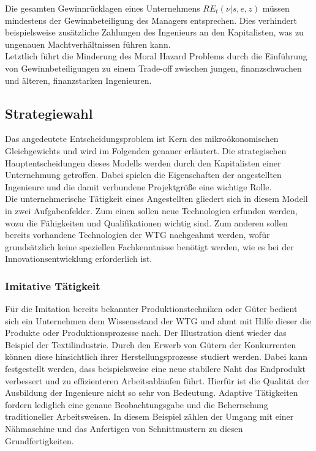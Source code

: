 Die gesamten Gewinnrücklagen eines Unternehmens $RE_t(\nu|s,e,z)$ müssen mindestens der Gewinnbeteiligung des Managers entsprechen. Dies verhindert beispielsweise zusätzliche Zahlungen des Ingenieurs an den Kapitalisten, was zu ungenauen Machtverhältnissen führen kann. \\


Letztlich führt die Minderung des Moral Hazard Problems durch die Einführung von Gewinnbeteiligungen zu einem Trade-off zwischen jungen, finanzschwachen und älteren, finanzstarken Ingenieuren. 


\subsection{Strategiewahl}\label{sec:Strategiewahl}
Das angedeutete Entscheidungsproblem ist Kern des mikroökonomischen Gleichgewichts und wird im Folgenden genauer erläutert. Die strategischen Hauptentscheidungen dieses Modells werden durch den Kapitalisten einer Unternehmung getroffen. Dabei spielen die Eigenschaften der angestellten Ingenieure und die damit verbundene Projektgrö{\ss}e eine wichtige Rolle. \\
Die unternehmerische Tätigkeit eines Angestellten gliedert sich in diesem Modell in zwei Aufgabenfelder. Zum einen sollen neue Technologien erfunden werden, wozu die Fähigkeiten und Qualifikationen wichtig sind. Zum anderen sollen bereits vorhandene Technologien der WTG nachgeahmt werden, wofür grundsätzlich keine speziellen Fachkenntnisse benötigt werden, wie es bei der Innovationsentwicklung erforderlich ist. 


\subsubsection{Imitative Tätigkeit}
Für die Imitation bereits bekannter Produktionstechniken oder Güter bedient sich ein Unternehmen dem Wissensstand der WTG und ahmt mit Hilfe dieser die Produkte oder Produktionsprozesse nach. Der Illustration dient wieder das Beispiel der Textilindustrie. Durch den Erwerb von Gütern der Konkurrenten können diese hinsichtlich ihrer Herstellungsprozesse studiert werden. Dabei kann festgestellt werden, dass beispielsweise eine neue stabilere Naht das Endprodukt verbessert und zu effizienteren Arbeitsabläufen führt. Hierfür ist die Qualität der Ausbildung der Ingenieure nicht so sehr von Bedeutung. Adaptive Tätigkeiten fordern lediglich eine genaue Beobachtungsgabe und die Beherrschung traditioneller Arbeitsweisen. In diesem Beispiel zählen der Umgang mit einer Nähmaschine und das Anfertigen von Schnittmustern zu diesen Grundfertigkeiten.


